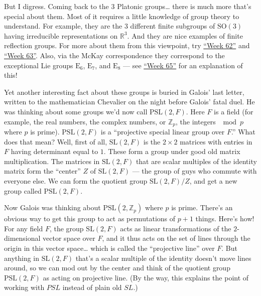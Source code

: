 \documentclass{article}
\def\tightlist{}
\renewcommand{\texttt}[1]{%
  \begingroup
  \ttfamily
  \begingroup\lccode`~=`/\lowercase{\endgroup\def~}{/\discretionary{}{}{}}%
  \begingroup\lccode`~=`[\lowercase{\endgroup\def~}{[\discretionary{}{}{}}%
  \begingroup\lccode`~=`.\lowercase{\endgroup\def~}{.\discretionary{}{}{}}%
  \catcode`/=\active\catcode`[=\active\catcode`.=\active
  \scantokens{#1\noexpand}%
  \endgroup
}
\begin{document}

But I digress. Coming back to the 3 Platonic groups\ldots{} there is
much more that's special about them. Most of it requires a little
knowledge of group theory to understand. For example, they are the 3
different finite subgroups of \(\mathrm{SO}(3)\) having irreducible
representations on \(\mathbb{R}^3\). And they are nice examples of
finite reflection groups. For more about them from this viewpoint, try
\protect\hyperlink{week62}{``Week 62''} and
\protect\hyperlink{week63}{``Week 63''}. Also, via the McKay
correspondence they correspond to the exceptional Lie groups
\(\mathrm{E}_6\), \(\mathrm{E}_7\), and \(\mathrm{E}_8\) --- see
\protect\hyperlink{week65}{``Week 65''} for an explanation of this!

Yet another interesting fact about these groups is buried in Galois'
last letter, written to the mathematician Chevalier on the night before
Galois' fatal duel. He was thinking about some groups we'd now call
\(\mathrm{PSL}(2,F)\). Here \(F\) is a field (for example, the real
numbers, the complex numbers, or \(\mathbb{Z}_p\), the integers
\(\mod p\) where \(p\) is prime). \(\mathrm{PSL}(2,F)\) is a
``projective special linear group over \(F\).'' What does that mean?
Well, first of all, \(\mathrm{SL}(2,F)\) is the \(2\times2\) matrices
with entries in \(F\) having determinant equal to \(1\). These form a
group under good old matrix multiplication. The matrices in
\(\mathrm{SL}(2,F)\) that are scalar multiples of the identity matrix
form the ``center'' \(Z\) of \(\mathrm{SL}(2,F)\) --- the group of guys
who commute with everyone else. We can form the quotient group
\(\mathrm{SL}(2,F)/Z\), and get a new group called
\(\mathrm{PSL}(2,F)\).

Now Galois was thinking about \(\mathrm{PSL}(2,\mathbb{Z}_p)\) where
\(p\) is prime. There's an obvious way to get this group to act as
permutations of \(p+1\) things. Here's how! For any field \(F\), the
group \(\mathrm{SL}(2,F)\) acts as linear transformations of the
\(2\)-dimensional vector space over \(F\), and it thus acts on the set
of lines through the origin in this vector space\ldots{} which is called
the ``projective line'' over \(F\). But anything in \(\mathrm{SL}(2,F)\)
that's a scalar multiple of the identity doesn't move lines around, so
we can mod out by the center and think of the quotient group
\(\mathrm{PSL}(2,F)\) as acting on projective line. (By the way, this
explains the point of working with \(PSL\) instead of plain old \(SL\).)
\end{document}
